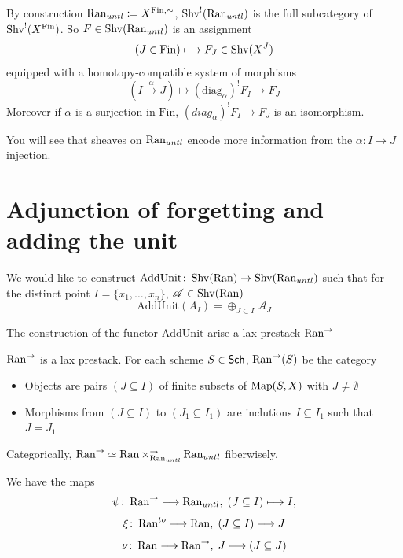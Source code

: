 \documentclass[oneside]{amsart}
\newcommand{\Fin}{\mathrm{Fin}}
\newcommand{\diag}{\mathrm{diag}}
\begin{document}
\begin{definition}
    By construction $\Ran_{untl} \coloneqq X^{\Fin,\sim}$,  $\operatorname{Shv}^!(\operatorname{Ran}_{untl})$ is the full subcategory of $\Shv^!(X^{\Fin})$. So $F \in \operatorname{Shv}(\operatorname{Ran}_{untl})$ is an assignment
    \[  
        (J \in \Fin) \mapsto F_J \in \Shv(X^J)
    \]
    equipped with a homotopy-compatible system of morphisms
    \[  
        (I \xrightarrow[]{\alpha}J) \mapsto (\diag_\alpha)^!F_I \to F_J
    \]
    Moreover if $\alpha$ is a surjection in $\Fin$, $(diag_\alpha)^!F_I \to F_J$ is an isomorphism.
\end{definition}

\begin{remark}
    You will see that sheaves on $\operatorname{Ran}_{untl}$ encode more information from the $\alpha\colon I \to J$ injection.
\end{remark}

\section{Adjunction of forgetting and adding the unit}
We would like to construct $\mathrm{AddUnit}\colon \Shv(\Ran) \to \Shv(\Ran_{untl})$ such that for the distinct point  $I=\{x_1, \dots, x_n\}$, $\mathscr{A} \in \operatorname{Shv}(\operatorname{Ran})$ \[    
    \mathrm{AddUnit}(A_{I}) = \oplus_{J \subset I} \mathcal A_J
\]

The construction of the functor $\mathrm{AddUnit}$ arise a lax prestack  $\Ran^{\to}$
\begin{definition}
    $\Ran^{\to}$ is a lax prestack. For each scheme $S \in \mathsf{Sch}$, $\Ran^{\to}(S)$ be the category 
    \begin{itemize}
        \item Objects are pairs $(J \subseteq I)$ of finite subsets of $\operatorname{Map}(S,X)$ with $J \neq \emptyset$
        \item Morphisms from $(J \subseteq I)$ to $(J_1 \subseteq I_1)$ are inclutions $I \subseteq I_1$ such that $J =J_1$
    \end{itemize}
\end{definition}

\begin{remark}
    Categorically, $\Ran^{\to} \simeq \Ran \times^{\to}_{\Ran_{untl}} \Ran_{untl}$ fiberwisely.
\end{remark}

We have the maps 
\[  
    \psi \colon \Ran^{\to} \to \Ran_{untl}, \thickspace (J\subseteq I) \mapsto I,
\]
\[  
    \xi \colon \Ran^{to} \to \Ran, \thickspace  (J \subseteq I) \mapsto J
\]
\[  
    \nu \colon \Ran \to \Ran^{\to}, \thickspace J \mapsto (J \subseteq J)
\]
\end{document}
